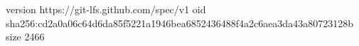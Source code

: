 version https://git-lfs.github.com/spec/v1
oid sha256:cd2a0a06c64d6da85f5221a1946bea6852436488f4a2c6aea3da43a80723128b
size 2466
